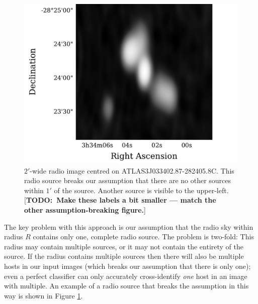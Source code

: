 \documentclass[fleqn,usenatbib,usedcolumn]{mnras}
\newcommand{\todo}[1]{ {\color{red}[{\bf TODO:~{#1}}]} }
\begin{document}
    \begin{figure}
      \centering
      \includegraphics[width=\linewidth]{images/ARG0003r2v_radio.pdf}
      \caption{$2'$-wide radio image centred on ATLAS3\textunderscore{}J033402.87-282405.8C.
        This radio source breaks our assumption that there are no other sources
        within $1'$ of the source. Another source is visible to the upper-left.
        \todo{Make these labels a bit smaller --- match the other
        assumption-breaking figure.}}
      \label{fig:broken-isolation}
    \end{figure}

    The key problem with this approach is our assumption that the radio sky
    within radius $R$ contains only one, complete radio source. The problem is
    two-fold: This radius may contain multiple sources, or it may not contain
    the entirety of the source. If the radius contains multiple sources then
    there will also be multiple hosts in our input images (which breaks our
    assumption that there is only one); even a perfect classifier can only
    accurately cross-identify \emph{one} host in an image with multiple. An
    example of a radio source that breaks the assumption in this way is shown
    in Figure \ref{fig:broken-isolation}.
\end{document}
